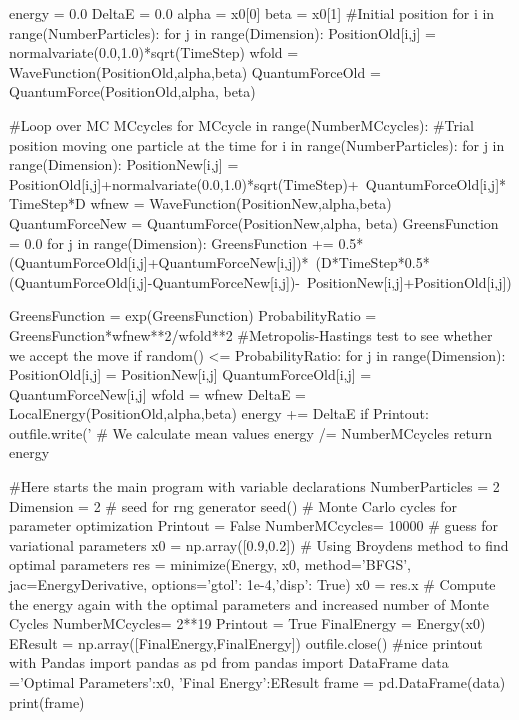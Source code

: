 \documentclass[%
oneside,                 %
final,                   %
10pt]{article}
\begin{document}
    energy = 0.0
    DeltaE = 0.0
    alpha = x0[0]
    beta = x0[1]
    #Initial position
    for i in range(NumberParticles):
        for j in range(Dimension):
            PositionOld[i,j] = normalvariate(0.0,1.0)*sqrt(TimeStep)
    wfold = WaveFunction(PositionOld,alpha,beta)
    QuantumForceOld = QuantumForce(PositionOld,alpha, beta)

    #Loop over MC MCcycles
    for MCcycle in range(NumberMCcycles):
        #Trial position moving one particle at the time
        for i in range(NumberParticles):
            for j in range(Dimension):
                PositionNew[i,j] = PositionOld[i,j]+normalvariate(0.0,1.0)*sqrt(TimeStep)+\
                                       QuantumForceOld[i,j]*TimeStep*D
            wfnew = WaveFunction(PositionNew,alpha,beta)
            QuantumForceNew = QuantumForce(PositionNew,alpha, beta)
            GreensFunction = 0.0
            for j in range(Dimension):
                GreensFunction += 0.5*(QuantumForceOld[i,j]+QuantumForceNew[i,j])*\
	                              (D*TimeStep*0.5*(QuantumForceOld[i,j]-QuantumForceNew[i,j])-\
                                      PositionNew[i,j]+PositionOld[i,j])
      
            GreensFunction = exp(GreensFunction)
            ProbabilityRatio = GreensFunction*wfnew**2/wfold**2
            #Metropolis-Hastings test to see whether we accept the move
            if random() <= ProbabilityRatio:
                for j in range(Dimension):
                    PositionOld[i,j] = PositionNew[i,j]
                    QuantumForceOld[i,j] = QuantumForceNew[i,j]
                wfold = wfnew
        DeltaE = LocalEnergy(PositionOld,alpha,beta)
        energy += DeltaE
        if Printout: 
           outfile.write('%
    # We calculate mean values
    energy /= NumberMCcycles
    return energy

#Here starts the main program with variable declarations
NumberParticles = 2
Dimension = 2
# seed for rng generator 
seed()
# Monte Carlo cycles for parameter optimization
Printout = False
NumberMCcycles= 10000
# guess for variational parameters
x0 = np.array([0.9,0.2])
# Using Broydens method to find optimal parameters
res = minimize(Energy, x0, method='BFGS', jac=EnergyDerivative, options={'gtol': 1e-4,'disp': True})
x0 = res.x
# Compute the energy again with the optimal parameters and increased number of Monte Cycles
NumberMCcycles= 2**19
Printout = True
FinalEnergy = Energy(x0)
EResult = np.array([FinalEnergy,FinalEnergy])
outfile.close()
#nice printout with Pandas
import pandas as pd
from pandas import DataFrame
data ={'Optimal Parameters':x0, 'Final Energy':EResult}
frame = pd.DataFrame(data)
print(frame)
\end{document}
